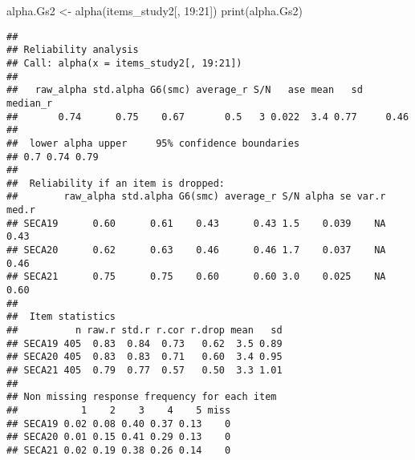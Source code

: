 \documentclass[
]{article}
\newenvironment{Shaded}{\begin{snugshade}}{\end{snugshade}}
\newcommand{\DecValTok}[1]{\textcolor[rgb]{0.00,0.00,0.81}{#1}}
\newcommand{\FunctionTok}[1]{\textcolor[rgb]{0.00,0.00,0.00}{#1}}
\newcommand{\NormalTok}[1]{#1}
\newcommand{\OtherTok}[1]{\textcolor[rgb]{0.56,0.35,0.01}{#1}}
\newcommand{\SpecialCharTok}[1]{\textcolor[rgb]{0.00,0.00,0.00}{#1}}
\begin{document}
\begin{Shaded}
\begin{Highlighting}[]
\NormalTok{alpha.Gs2 }\OtherTok{\textless{}{-}} \FunctionTok{alpha}\NormalTok{(items\_study2[, }\DecValTok{19}\SpecialCharTok{:}\DecValTok{21}\NormalTok{])}
\FunctionTok{print}\NormalTok{(alpha.Gs2)}
\end{Highlighting}
\end{Shaded}

\begin{verbatim}
## 
## Reliability analysis   
## Call: alpha(x = items_study2[, 19:21])
## 
##   raw_alpha std.alpha G6(smc) average_r S/N   ase mean   sd median_r
##       0.74      0.75    0.67       0.5   3 0.022  3.4 0.77     0.46
## 
##  lower alpha upper     95% confidence boundaries
## 0.7 0.74 0.79 
## 
##  Reliability if an item is dropped:
##        raw_alpha std.alpha G6(smc) average_r S/N alpha se var.r med.r
## SECA19      0.60      0.61    0.43      0.43 1.5    0.039    NA  0.43
## SECA20      0.62      0.63    0.46      0.46 1.7    0.037    NA  0.46
## SECA21      0.75      0.75    0.60      0.60 3.0    0.025    NA  0.60
## 
##  Item statistics 
##          n raw.r std.r r.cor r.drop mean   sd
## SECA19 405  0.83  0.84  0.73   0.62  3.5 0.89
## SECA20 405  0.83  0.83  0.71   0.60  3.4 0.95
## SECA21 405  0.79  0.77  0.57   0.50  3.3 1.01
## 
## Non missing response frequency for each item
##           1    2    3    4    5 miss
## SECA19 0.02 0.08 0.40 0.37 0.13    0
## SECA20 0.01 0.15 0.41 0.29 0.13    0
## SECA21 0.02 0.19 0.38 0.26 0.14    0
\end{verbatim}
\end{document}
